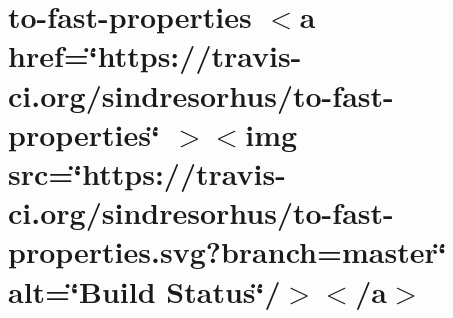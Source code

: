 \documentclass[twoside]{book}
\newcommand{\+}{\discretionary{\mbox{\scriptsize$\hookleftarrow$}}{}{}}
\begin{document}
\chapter{to-\/fast-\/properties \texorpdfstring{$<$}{<}a href=\char`\"{}https\+://travis-\/ci.\+org/sindresorhus/to-\/fast-\/properties\char`\"{} \texorpdfstring{$>$}{>}\texorpdfstring{$<$}{<}img src=\char`\"{}https\+://travis-\/ci.\+org/sindresorhus/to-\/fast-\/properties.\+svg?branch=master\char`\"{} alt=\char`\"{}\+Build Status\char`\"{}/\texorpdfstring{$>$}{>}\texorpdfstring{$<$}{<}/a\texorpdfstring{$>$}{>}}
\label{md__c___users_vaishnavi_jadhav__desktop__developer_code_mean_stack_example_client_node_modules_to_fast_properties_readme}

\end{document}
